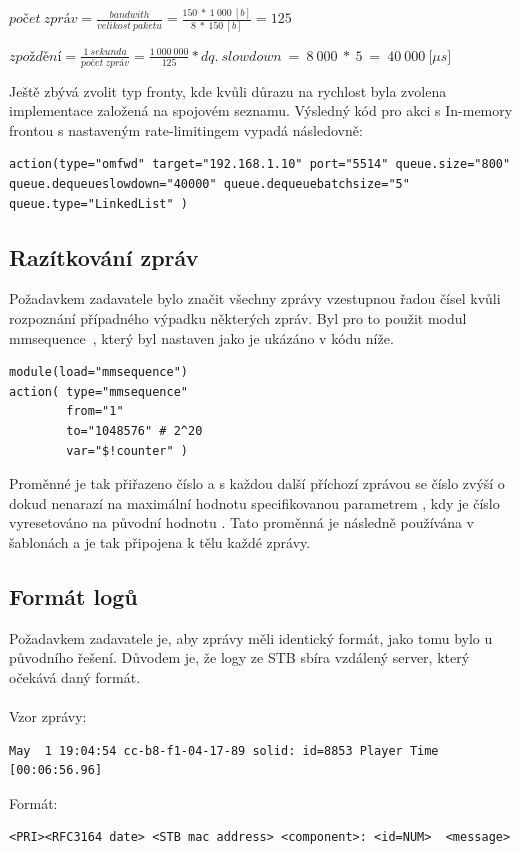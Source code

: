 \documentclass[thesis=B,czech]{FITthesis}[2012/06/26]
\begin{document}
\begin{description}
  \item $počet~zpráv=\frac{bandwith}{velikost~paketu}=\frac{150~*~1~000~[b]}{8~*~150~[b]}=125$
  \item $zpoždění=\frac{1~sekunda}{počet~zpráv}=\frac{1~000~000}{125}*dq.~slowdown~=~8~000~*~5~=~40~000~[\mu$$s]$
\end{description}
Ještě zbývá zvolit typ fronty, kde kvůli důrazu na rychlost byla zvolena implementace založená na spojovém seznamu.
Výsledný kód pro akci s In-memory frontou s nastaveným rate-limitingem vypadá následovně:
\begin{lstlisting}[style=RainerScriptSimpleStyle]
action(type="omfwd" target="192.168.1.10" port="5514" queue.size="800" queue.dequeueslowdown="40000" queue.dequeuebatchsize="5" queue.type="LinkedList" )
\end{lstlisting}


\subsection{Razítkování zpráv}
Požadavkem zadavatele bylo značit všechny zprávy vzestupnou řadou čísel kvůli rozpoznání případného výpadku některých zpráv.
Byl pro to použit modul mmsequence~\cite{RsyslogMmsequence}, který byl nastaven jako je ukázáno v kódu níže.
\begin{lstlisting}[style=RainerScriptSimpleStyle]
module(load="mmsequence")
action(	type="mmsequence"
		from="1"
		to="1048576" # 2^20
		var="$!counter" )
\end{lstlisting}
Proměnné  je tak přiřazeno číslo  a s každou další příchozí zprávou se číslo zvýší o  dokud nenarazí na maximální hodnotu specifikovanou parametrem , kdy je číslo vyresetováno na původní hodnotu .
Tato proměnná je následně používána v šablonách a je tak připojena k tělu každé zprávy.

\subsection{Formát logů}
Požadavkem zadavatele je, aby zprávy měli identický formát, jako tomu bylo u původního řešení. Důvodem je, že logy ze STB sbíra vzdálený server, který očekává daný formát.
\\
\\
Vzor zprávy:
\begin{lstlisting}[style=RainerScriptSimpleStyle]
May  1 19:04:54 cc-b8-f1-04-17-89 solid: id=8853 Player Time [00:06:56.96]
\end{lstlisting}
Formát:
\begin{lstlisting}[style=RainerScriptSimpleStyle]
<PRI><RFC3164 date> <STB mac address> <component>: <id=NUM>  <message>
\end{lstlisting}
\end{document}
